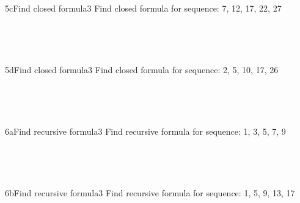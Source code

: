 \documentclass[a4paper,12pt]{book}
\begin{document}
    ~\\
    
    \hrulefill
    
    ~\\
    \begin{answersheetquestion}{5c}{Find closed formula}{3}
        Find closed formula for sequence: 7, 12, 17, 22, 27
        \iftoggle{answerkey}{ \begin{answer} $a_{n} = 5n+2$ \end{answer} }{ { ~\\ \raisebox{0pt}[2cm][0pt]{  } } }
    \end{answersheetquestion}
    
    ~\\
    
    \hrulefill
    
    ~\\
    \begin{answersheetquestion}{5d}{Find closed formula}{3}
        Find closed formula for sequence: 2, 5, 10, 17, 26
        \iftoggle{answerkey}{ \begin{answer} $a_{n} = n^{2} + 1$ \end{answer} }{ { ~\\ \raisebox{0pt}[2cm][0pt]{  } } }
    \end{answersheetquestion}

    ~\\
    
    \hrulefill
    
    ~\\
    \begin{answersheetquestion}{6a}{Find recursive formula}{3}
        Find recursive formula for sequence: 1, 3, 5, 7, 9
        \iftoggle{answerkey}{ \begin{answer} $a_{n} = a_{n-1} + 2$ \end{answer} }{ { ~\\ \raisebox{0pt}[2cm][0pt]{  } } }
    \end{answersheetquestion}

    ~\\
    
    \hrulefill
    
    ~\\
    \begin{answersheetquestion}{6b}{Find recursive formula}{3}
        Find recursive formula for sequence: 1, 5, 9, 13, 17
        \iftoggle{answerkey}{ \begin{answer} $a_{n} = a_{n-1} + 4$ \end{answer} }{ { ~\\ \raisebox{0pt}[2cm][0pt]{  } } }
    \end{answersheetquestion}
\end{document}

